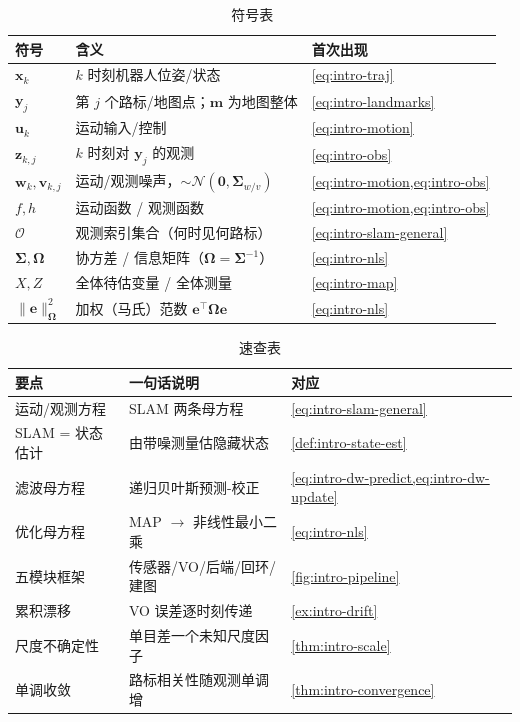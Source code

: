 \begin{table}[H]\centering\small
\caption{符号表}
\begin{tabular}{lll}
\toprule
符号 & 含义 & 首次出现 \\
\midrule
$\mathbf{x}_k$ & $k$ 时刻机器人位姿/状态 & \cref{eq:intro-traj} \\
$\mathbf{y}_j$ & 第 $j$ 个路标/地图点；$\mathbf{m}$ 为地图整体 & \cref{eq:intro-landmarks} \\
$\mathbf{u}_k$ & 运动输入/控制 & \cref{eq:intro-motion} \\
$\mathbf{z}_{k,j}$ & $k$ 时刻对 $\mathbf{y}_j$ 的观测 & \cref{eq:intro-obs} \\
$\mathbf{w}_k,\mathbf{v}_{k,j}$ & 运动/观测噪声，$\sim\mathcal{N}(\mathbf{0},\boldsymbol{\Sigma}_{w/v})$ & \cref{eq:intro-motion,eq:intro-obs} \\
$f,h$ & 运动函数 / 观测函数 & \cref{eq:intro-motion,eq:intro-obs} \\
$\mathcal{O}$ & 观测索引集合（何时见何路标） & \cref{eq:intro-slam-general} \\
$\boldsymbol{\Sigma},\boldsymbol{\Omega}$ & 协方差 / 信息矩阵（$\boldsymbol{\Omega}=\boldsymbol{\Sigma}^{-1}$） & \cref{eq:intro-nls} \\
$X,Z$ & 全体待估变量 / 全体测量 & \cref{eq:intro-map} \\
$\|\mathbf{e}\|_{\boldsymbol{\Omega}}^2$ & 加权（马氏）范数 $\mathbf{e}^\top\boldsymbol{\Omega}\mathbf{e}$ & \cref{eq:intro-nls} \\
\bottomrule
\end{tabular}
\end{table}

\begin{table}[H]\centering\small
\caption{速查表}
\begin{tabular}{lll}
\toprule
要点 & 一句话说明 & 对应 \\
\midrule
运动/观测方程 & SLAM 两条母方程 & \cref{eq:intro-slam-general} \\
SLAM = 状态估计 & 由带噪测量估隐藏状态 & \cref{def:intro-state-est} \\
滤波母方程 & 递归贝叶斯预测-校正 & \cref{eq:intro-dw-predict,eq:intro-dw-update} \\
优化母方程 & MAP $\to$ 非线性最小二乘 & \cref{eq:intro-nls} \\
五模块框架 & 传感器/VO/后端/回环/建图 & \cref{fig:intro-pipeline} \\
累积漂移 & VO 误差逐时刻传递 & \cref{ex:intro-drift} \\
尺度不确定性 & 单目差一个未知尺度因子 & \cref{thm:intro-scale} \\
单调收敛 & 路标相关性随观测单调增 & \cref{thm:intro-convergence} \\
\bottomrule
\end{tabular}
\end{table}

